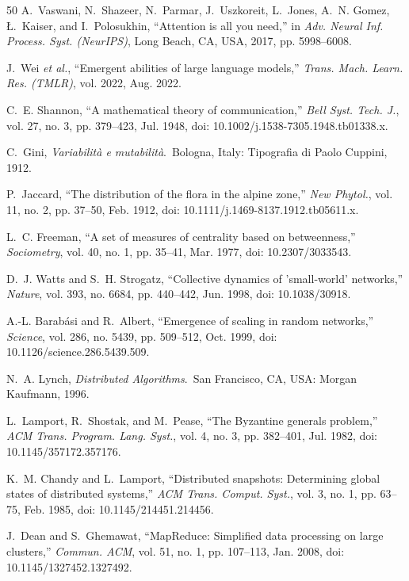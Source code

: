 \documentclass{ieeeaccess}
\begin{document}
\begin{thebibliography}{50}
A.~Vaswani, N.~Shazeer, N.~Parmar, J.~Uszkoreit, L.~Jones, A.~N. Gomez, {\L}.~Kaiser, and I.~Polosukhin, ``Attention is all you need,'' in \emph{Adv. Neural Inf. Process. Syst. (NeurIPS)}, Long Beach, CA, USA, 2017, pp. 5998--6008.

J.~Wei \emph{et al.}, ``Emergent abilities of large language models,'' \emph{Trans. Mach. Learn. Res. (TMLR)}, vol. 2022, Aug. 2022.

C.~E. Shannon, ``A mathematical theory of communication,'' \emph{Bell Syst. Tech. J.}, vol. 27, no. 3, pp. 379--423, Jul. 1948, doi: 10.1002/j.1538-7305.1948.tb01338.x.

C.~Gini, \emph{Variabilit{\`a} e mutabilit{\`a}}.\ Bologna, Italy: Tipografia di Paolo Cuppini, 1912.

P.~Jaccard, ``The distribution of the flora in the alpine zone,'' \emph{New Phytol.}, vol. 11, no. 2, pp. 37--50, Feb. 1912, doi: 10.1111/j.1469-8137.1912.tb05611.x.

L.~C. Freeman, ``A set of measures of centrality based on betweenness,'' \emph{Sociometry}, vol. 40, no. 1, pp. 35--41, Mar. 1977, doi: 10.2307/3033543.

D.~J. Watts and S.~H. Strogatz, ``Collective dynamics of 'small-world' networks,'' \emph{Nature}, vol. 393, no. 6684, pp. 440--442, Jun. 1998, doi: 10.1038/30918.

A.-L. Barab{\'a}si and R.~Albert, ``Emergence of scaling in random networks,'' \emph{Science}, vol. 286, no. 5439, pp. 509--512, Oct. 1999, doi: 10.1126/science.286.5439.509.

N.~A. Lynch, \emph{Distributed Algorithms}.\ San Francisco, CA, USA: Morgan Kaufmann, 1996.

L.~Lamport, R.~Shostak, and M.~Pease, ``The Byzantine generals problem,'' \emph{ACM Trans. Program. Lang. Syst.}, vol. 4, no. 3, pp. 382--401, Jul. 1982, doi: 10.1145/357172.357176.

K.~M. Chandy and L.~Lamport, ``Distributed snapshots: Determining global states of distributed systems,'' \emph{ACM Trans. Comput. Syst.}, vol. 3, no. 1, pp. 63--75, Feb. 1985, doi: 10.1145/214451.214456.

J.~Dean and S.~Ghemawat, ``MapReduce: Simplified data processing on large clusters,'' \emph{Commun. ACM}, vol. 51, no. 1, pp. 107--113, Jan. 2008, doi: 10.1145/1327452.1327492.


\end{thebibliography}
\end{document}
